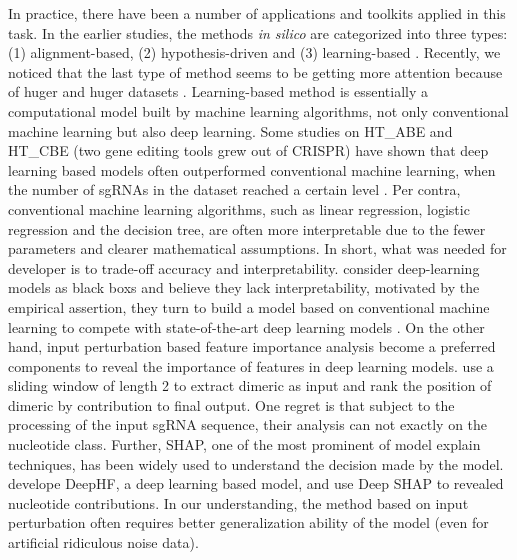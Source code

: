 \documentclass{bioinfo}
\begin{document}
In practice, there have been a number of applications and toolkits applied in this task. In the earlier studies, the methods \emph{in silico} are categorized into three types: 
(1) alignment-based, (2) hypothesis-driven and (3) learning-based \citep{chuai2018deepcrispr}. 
Recently, we noticed that the last type of method seems to be getting more attention because of huger and huger datasets \citep{liu2019computational}. 
Learning-based method is essentially a computational model built by machine learning algorithms, not only conventional machine learning but also deep learning. 
Some studies on HT\_ABE and HT\_CBE (two gene editing tools grew out of CRISPR) have shown that deep learning based models often outperformed conventional machine learning, when the number of sgRNAs in the dataset reached a certain level \citep{kim2018deep,kim2019spcas9,Song2020}. 
Per contra, conventional machine learning algorithms, such as linear regression, logistic regression and the decision tree, are often more interpretable due to the fewer parameters and clearer mathematical assumptions. 
In short, what was needed for developer is to trade-off accuracy and interpretability. 
 \citeauthor{MuhammadRafid2020} consider deep-learning models as black boxs and believe they lack interpretability, 
 motivated by the empirical assertion, they turn to build a model based on conventional machine learning to compete with state-of-the-art deep learning models \citep{MuhammadRafid2020}. 
 On the other hand, input perturbation based feature importance analysis become a preferred components to reveal the importance of features in deep learning models. 
 \citeauthor{Liu2019} use a sliding window of length 2 to extract dimeric as input and rank the position of dimeric by contribution to final output. 
 One regret is that subject to the processing of the input sgRNA sequence, their analysis can not exactly on the nucleotide class. 
 Further, SHAP, one of the most prominent of model explain techniques, has been widely used to understand the decision made by the model. 
 \citeauthor{wang2019optimized} develope DeepHF, a deep learning based model, and use Deep SHAP to revealed nucleotide contributions. 
 In our understanding, the method based on input perturbation often requires better generalization ability of the model (even for artificial ridiculous noise data). 
\end{document}

